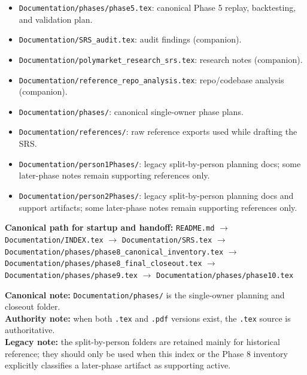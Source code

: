 \documentclass{article}
\begin{document}
\begin{itemize}
\item \texttt{Documentation/phases/phase5.tex}: canonical Phase 5 replay, backtesting, and validation plan.
\item \texttt{Documentation/SRS\_audit.tex}: audit findings (companion).
\item \texttt{Documentation/polymarket\_research\_srs.tex}: research notes (companion).
\item \texttt{Documentation/reference\_repo\_analysis.tex}: repo/codebase analysis (companion).
\item \texttt{Documentation/phases/}: canonical single-owner phase plans.
\item \texttt{Documentation/references/}: raw reference exports used while drafting the SRS.
\item \texttt{Documentation/person1Phases/}: legacy split-by-person planning docs; some later-phase notes remain supporting references only.
\item \texttt{Documentation/person2Phases/}: legacy split-by-person planning docs and support artifacts; some later-phase notes remain supporting references only.
\end{itemize}

\textbf{Canonical path for startup and handoff:}
\texttt{README.md} $\rightarrow$ \texttt{Documentation/INDEX.tex} $\rightarrow$
\texttt{Documentation/SRS.tex} $\rightarrow$
\texttt{Documentation/phases/phase8\_canonical\_inventory.tex} $\rightarrow$
\texttt{Documentation/phases/phase8\_final\_closeout.tex} $\rightarrow$
\texttt{Documentation/phases/phase9.tex} $\rightarrow$
\texttt{Documentation/phases/phase10.tex}

\textbf{Canonical note:} \texttt{Documentation/phases/} is the single-owner
planning and closeout folder.\\
\textbf{Authority note:} when both \texttt{.tex} and \texttt{.pdf} versions
exist, the \texttt{.tex} source is authoritative.\\
\textbf{Legacy note:} the split-by-person folders are retained mainly for
historical reference; they should only be used when this index or the Phase 8
inventory explicitly classifies a later-phase artifact as supporting active.
\end{document}
